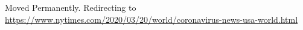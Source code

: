 Moved Permanently. Redirecting to
\url{https://www.nytimes.com/2020/03/20/world/coronavirus-news-usa-world.html}
